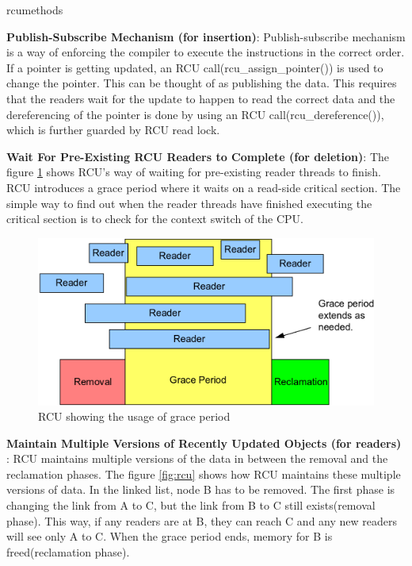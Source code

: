 \begin{labeling}{rcumethods}
\item[\textbf{Publish-Subscribe Mechanism (for insertion)}:]
Publish-subscribe mechanism is a way of enforcing the compiler to execute the instructions in the correct order. If a pointer is getting updated, an RCU call(rcu\_assign\_pointer())  is used to change the pointer. This can be thought of as publishing the data. This requires that the readers wait for the update to happen to read the correct data and the dereferencing of the pointer is done by using an RCU call(rcu\_dereference()), which is further guarded by RCU read lock.

\item[\textbf{Wait For Pre-Existing RCU Readers to Complete (for deletion)}:]
The figure \ref{fig:rcu_grace} shows RCU's way of waiting for pre-existing reader threads to finish. RCU introduces a grace period where it waits on a read-side critical section. The simple way to find out when the reader threads have finished executing the critical section is to check for the context switch of the CPU. 

\begin{figure}[h]
\centering
\includegraphics[width=0.7\linewidth]{figures/rcu_grace}
\caption{RCU showing the usage of grace period \cite{whatisrcu}}
\label{fig:rcu_grace}
\end{figure}

\item[\textbf{Maintain Multiple Versions of Recently Updated Objects (for readers)}]:
RCU maintains multiple versions of the data in between the removal and the reclamation phases. The figure \ref{fig:rcu} shows how RCU maintains these multiple versions of data. In the linked list, node B has to be removed. The first phase is changing the link from A to C, but the link from B to C still exists(removal phase). This way, if any readers are at B, they can reach C and any new readers will see only A to C. When the grace period ends, memory for B is freed(reclamation phase).


\end{labeling}
